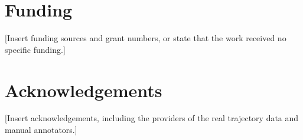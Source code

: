 \documentclass[11pt]{article}
\begin{document}
\section*{Funding}

[Insert funding sources and grant numbers, or state that the work received no specific funding.]

\section*{Acknowledgements}

[Insert acknowledgements, including the providers of the real trajectory data and manual annotators.]



\end{document}
